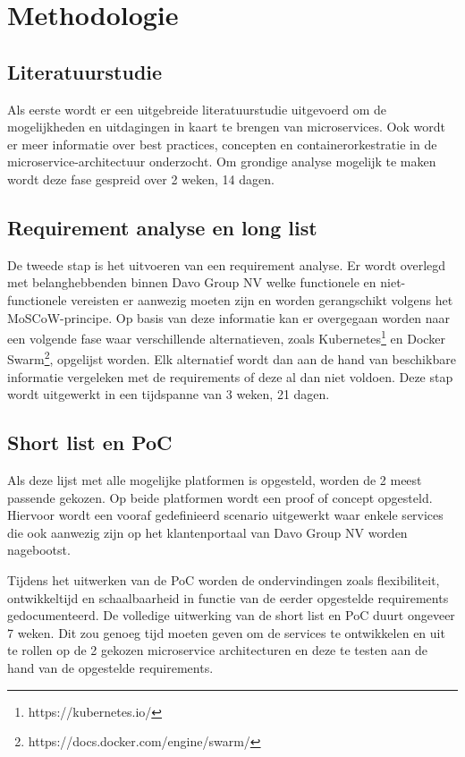 
\section{Methodologie}%
\label{sec:methodologie}
\subsection{Literatuurstudie}
Als eerste wordt er een uitgebreide literatuurstudie uitgevoerd om de mogelijkheden en uitdagingen in kaart te brengen van microservices. Ook wordt er meer informatie over best practices, concepten en containerorkestratie in de microservice-architectuur onderzocht. Om grondige analyse mogelijk te maken wordt deze fase gespreid over 2 weken, 14 dagen.
\subsection{Requirement analyse en long list}
De tweede stap is het uitvoeren van een requirement analyse. Er wordt overlegd met belanghebbenden binnen Davo Group NV welke functionele en niet-functionele vereisten er aanwezig moeten zijn en worden gerangschikt volgens het MoSCoW-principe. Op basis van deze informatie kan er overgegaan worden naar een volgende fase waar verschillende alternatieven, zoals Kubernetes\footnote{https://kubernetes.io/} en Docker Swarm\footnote{https://docs.docker.com/engine/swarm/}, opgelijst worden. Elk alternatief wordt dan aan de hand van beschikbare informatie vergeleken met de requirements of deze al dan niet voldoen. Deze stap wordt uitgewerkt in een tijdspanne van 3 weken, 21 dagen.
\subsection{Short list en PoC}
Als deze lijst met alle mogelijke platformen is opgesteld, worden de 2 meest passende gekozen. Op beide platformen wordt een proof of concept opgesteld. Hiervoor wordt een vooraf gedefinieerd scenario uitgewerkt waar enkele services die ook aanwezig zijn op het klantenportaal van Davo Group NV worden nagebootst. 

Tijdens het uitwerken van de PoC worden de ondervindingen zoals flexibiliteit, ontwikkeltijd en schaalbaarheid in functie van de eerder opgestelde requirements gedocumenteerd. De volledige uitwerking van de short list en PoC duurt ongeveer 7 weken. Dit zou genoeg tijd moeten geven om de services te ontwikkelen en uit te rollen op de 2 gekozen microservice architecturen en deze te testen aan de hand van de opgestelde requirements.
